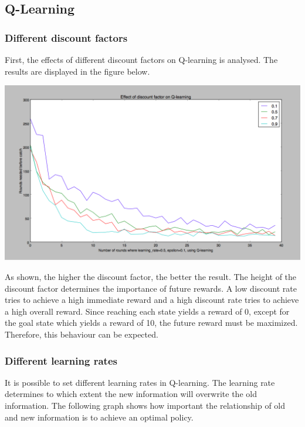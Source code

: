 \documentclass{article}
\begin{document}
\subsection{Q-Learning}

\subsubsection{Different discount factors}
First, the effects of different discount factors on Q-learning is analysed. The results are displayed in the figure below.

\begin{center}
	\includegraphics[scale=0.2]{discount_factors}
\end{center}

As shown, the higher the discount factor, the better the result. The height of the discount factor determines the importance of future rewards. A low discount rate tries to achieve a high immediate reward and a high discount rate tries to achieve a high overall reward. Since reaching each state yields a reward of 0, except for the goal state which yields a reward of 10, the future reward must be maximized. Therefore, this behaviour can be expected. 

\subsubsection{Different learning rates}
It is possible to set different learning rates in Q-learning. The learning rate determines to which extent the new information will overwrite the old information. The following graph shows how important the relationship of old and new information is to achieve an optimal policy.
\end{document}
